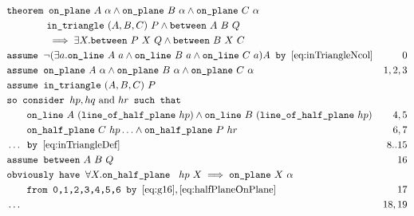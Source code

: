 \begin{boxedfigure}
\small
\begin{align*}
&\texttt{theorem }\code{on\_plane}\ A\ \alpha \wedge \code{on\_plane}\ B\ \alpha \wedge \code{on\_plane}\ C\ \alpha\\
&\qquad\qquad\code{in\_triangle}\ (A,B,C)\ P \wedge \between{A}{B}{Q}\\
&\qquad\qquad\implies\exists X. \between{P}{X}{Q} \wedge \between{B}{X}{C}\\
&\texttt{assume } \Triangle{a}{A}{B}{C}A \texttt{ by } \eqref{eq:inTriangleNcol}&0\\
&\texttt{assume } \code{on\_plane}\ A\ \alpha \wedge \code{on\_plane}\ B\ \alpha \wedge \code{on\_plane}\ C\ \alpha&1,2,3\\
  &\texttt{assume } \code{in\_triangle}\ (A,B,C)\ P\\
  &\texttt{so consider } hp, hq \text{ and } hr \texttt{ such that }\\
&\qquad \code{on\_line}\ A\ (\code{line\_of\_half\_plane}\ hp) \wedge \code{on\_line}\ B\ (\code{line\_of\_half\_plane}\ hp)& 4,5\\ 
&\qquad \code{on\_half\_plane}\ C\ hp\ldots \wedge \code{on\_half\_plane}\ P\ hr & 6,7\\
&\ldots \texttt{ by } \eqref{eq:inTriangleDef} & 8..15\\
&\texttt{assume } \between{A}{B}{Q} & 16\\
&\texttt{obviously have } \forall X. \code{on\_half\_plane }\ hp\ X \implies \code{on\_plane}\ X\ \alpha\\ &\qquad\texttt{from 0,1,2,3,4,5,6 by } \eqref{eq:g16}, \eqref{eq:halfPlaneOnPlane}& 17\\
&\ldots & 18,19

\end{align*}
\end{boxedfigure}
